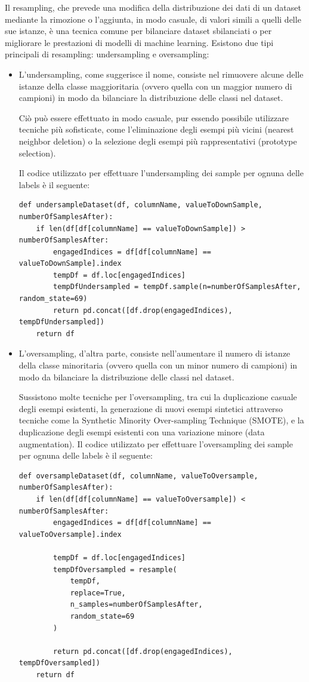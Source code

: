 Il resampling, che prevede una modifica  della distribuzione dei dati di un dataset mediante la rimozione o l’aggiunta, in modo casuale, di valori simili a quelli delle sue istanze, è una tecnica comune per bilanciare dataset sbilanciati o per migliorare le prestazioni di modelli di machine learning. Esistono due tipi principali di resampling: undersampling e oversampling:
\begin{itemize}
    \item L'undersampling, come suggerisce il nome, consiste nel rimuovere alcune delle istanze della classe maggioritaria (ovvero quella con un maggior numero di campioni) in modo da bilanciare la distribuzione delle classi nel dataset. 
    
Ciò può essere effettuato in modo casuale, pur essendo possibile utilizzare tecniche più sofisticate, come l'eliminazione degli esempi più vicini (nearest neighbor deletion) o la selezione degli esempi più rappresentativi (prototype selection). 

Il codice utilizzato per effettuare l’undersampling dei sample per ognuna delle labels è il seguente:
\begin{verbatim}
def undersampleDataset(df, columnName, valueToDownSample, numberOfSamplesAfter):
    if len(df[df[columnName] == valueToDownSample]) > numberOfSamplesAfter:
        engagedIndices = df[df[columnName] == valueToDownSample].index
        tempDf = df.loc[engagedIndices]
        tempDfUndersampled = tempDf.sample(n=numberOfSamplesAfter, random_state=69)
        return pd.concat([df.drop(engagedIndices), tempDfUndersampled])
    return df
\end{verbatim}
\item L'oversampling, d'altra parte, consiste nell'aumentare il numero di istanze della classe minoritaria (ovvero quella con un minor numero di campioni) in modo da bilanciare la distribuzione delle classi nel dataset.

Sussistono molte tecniche per l'oversampling, tra cui la duplicazione casuale degli esempi esistenti, la generazione di nuovi esempi sintetici attraverso tecniche come la Synthetic Minority Over-sampling Technique (SMOTE), e la duplicazione degli esempi esistenti con una variazione minore (data augmentation). 
Il codice utilizzato per effettuare l’oversampling dei sample per ognuna delle labels è il seguente:
\begin{verbatim}
def oversampleDataset(df, columnName, valueToOversample, numberOfSamplesAfter):
    if len(df[df[columnName] == valueToOversample]) < numberOfSamplesAfter:
        engagedIndices = df[df[columnName] == valueToOversample].index
        
        tempDf = df.loc[engagedIndices]
        tempDfOversampled = resample(
            tempDf, 
            replace=True, 
            n_samples=numberOfSamplesAfter, 
            random_state=69
        )
        
        return pd.concat([df.drop(engagedIndices), tempDfOversampled])
    return df
\end{verbatim}

\end{itemize}

